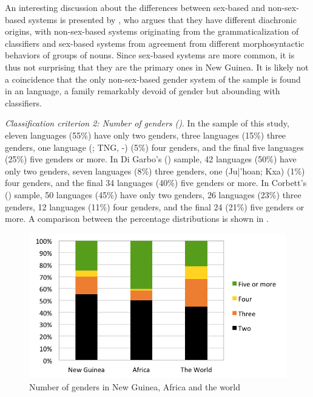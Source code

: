 \documentclass[output=collectionpaper]{langsci/langscibook}
\begin{document}
An interesting discussion about the differences between sex-based and non-sex-based systems is presented by \citet{Luraghi2011}, who argues that they have different diachronic origins, with non-sex-based systems originating from the grammaticalization of classifiers and sex-based systems from agreement from different morphosyntactic behaviors of groups of nouns. Since sex-based systems are more common, it is thus not surprising that they are the primary ones in New Guinea. It is likely not a coincidence that the only non-sex-based gender system of the sample is found in an  language, a family remarkably devoid of gender but abounding with classifiers.


\textit{Classification criterion 2: Number of genders ()}. In the sample of this study, eleven languages (55\%) have only two genders, three languages (15\%) three genders, one language (; TNG, -) (5\%) four genders, and the final five languages (25\%) five genders or more. In Di Garbo's (\citealt*[65]{DiGarbo2014}) sample, 42 languages (50\%) have only two genders, seven languages (8\%) three genders, one (Ju|’hoan; Kxa) (1\%) four genders, and the final 34 languages (40\%) five genders or more. In Corbett's (\citealt*{Corbett2013}) sample, 50 languages (45\%) have only two genders, 26 languages (23\%) three genders, 12 languages (11\%) four genders, and the final 24 (21\%) five genders or more. A comparison between the percentage distributions is shown in .


\begin{figure}
\includegraphics[width=\textwidth]{figures/09/fig8.png}
\caption{Number of genders in New Guinea, Africa and the world}
\label{fig:Svard:8}
\end{figure}
\end{document}
